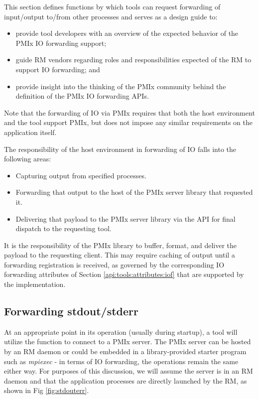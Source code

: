 This section defines functions by which tools can request forwarding of input/output to/from other processes and serves as a design guide to:

\begin{itemize}
    \item provide tool developers with an overview of the expected behavior of the \ac{PMIx} \ac{IO} forwarding support;
    \item guide \ac{RM} vendors regarding roles and responsibilities expected of the \ac{RM} to support \ac{IO} forwarding; and
    \item provide insight into the thinking of the \ac{PMIx} community behind the definition of the \ac{PMIx} \ac{IO} forwarding \acp{API}.
\end{itemize}

Note that the forwarding of \ac{IO} via \ac{PMIx} requires that both the host environment and the tool support \ac{PMIx}, but does not impose any similar requirements on the application itself.

The responsibility of the host environment in forwarding of \ac{IO} falls into the following areas:

\begin{itemize}
    \item Capturing output from specified processes.
    \item Forwarding that output to the host of the \ac{PMIx} server library that requested it.
    \item Delivering that payload to the \ac{PMIx} server library via the  \ac{API} for final dispatch to the requesting tool.
\end{itemize}

It is the responsibility of the \ac{PMIx} library to buffer, format, and deliver the payload to the requesting client. This may require caching of output until a forwarding registration is received, as governed by the corresponding \ac{IO} forwarding attributes of Section \ref{api:tools:attributes:iof} that are supported by the implementation.


\subsection{Forwarding stdout/stderr}

At an appropriate point in its operation (usually during startup), a tool will utilize the  function to connect to a \ac{PMIx} server. The \ac{PMIx} server can be hosted by an \ac{RM} daemon or could be embedded in a library-provided starter program such as \textit{mpiexec} - in terms of \ac{IO} forwarding, the operations remain the same either way. For purposes of this discussion, we will assume the server is in an \ac{RM} daemon and that the application processes are directly launched by the \ac{RM}, as shown in Fig \ref{fig:stdouterr}.

